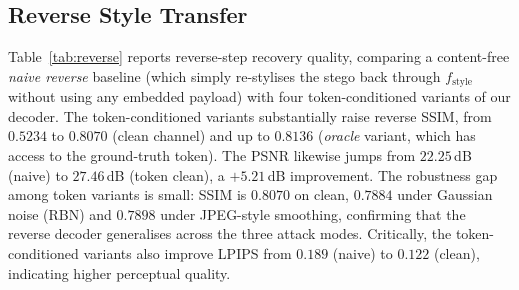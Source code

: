 \documentclass[conference]{IEEEtran}
\begin{document}
\subsection{Reverse Style Transfer}
\label{sec:exp_reverse}
Table~\ref{tab:reverse} reports reverse-step recovery quality, comparing a content-free \emph{naive reverse} baseline (which simply re-stylises the stego back through $f_{\text{style}}$ without using any embedded payload) with four token-conditioned variants of our decoder. The token-conditioned variants substantially raise reverse SSIM, from $0.5234$ to $0.8070$ (clean channel) and up to $0.8136$ (\emph{oracle} variant, which has access to the ground-truth token). The PSNR likewise jumps from $22.25$\,dB (naive) to $27.46$\,dB (token clean), a $+5.21$\,dB improvement. The robustness gap among token variants is small: SSIM is $0.8070$ on clean, $0.7884$ under Gaussian noise (RBN) and $0.7898$ under JPEG-style smoothing, confirming that the reverse decoder generalises across the three attack modes. Critically, the token-conditioned variants also improve LPIPS from $0.189$ (naive) to $0.122$ (clean), indicating higher perceptual quality.

\begin{table}[t]
\centering
\caption{Reverse style transfer comparison ($600$ evaluation pairs, $\sigma_{\text{eval}}\!=\!1.36$). \textit{naive\_reverse} is a content-free re-stylisation baseline; \textit{token\_*} variants use our reverse decoder. \textit{oracle} reads the ground-truth token, the others operate on the decoded token after identity / RBN / JPEG distortion.}
\label{tab:reverse}
\setlength{\tabcolsep}{2.5pt}
\end{table}
\end{document}
